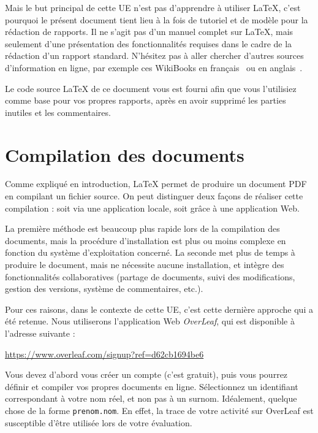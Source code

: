 \documentclass{ceri/sty/rapport}
\begin{document}
Mais le but principal de cette UE n'est pas d'apprendre à utiliser \LaTeX{}, c'est pourquoi le présent document tient lieu à la fois de tutoriel et de modèle pour la rédaction de rapports. Il ne s'agit pas d'un manuel complet sur \LaTeX{}, mais seulement d'une présentation des fonctionnalités requises dans le cadre de la rédaction d'un rapport standard. N'hésitez pas à aller chercher d'autres sources d'information en ligne, par exemple ces WikiBooks en français~\cite{Wikibooks2010} ou en anglais~\cite{Wikibooks2011}.
	
Le code source \LaTeX{} de ce document vous est fourni afin que vous l'utilisiez comme base pour vos propres rapports, après en avoir supprimé les parties inutiles et les commentaires.









\section{Compilation des documents}
\label{sec:Compilation}
Comme expliqué en introduction, \LaTeX{} permet de produire un document PDF en compilant un fichier source. On peut distinguer deux façons de réaliser cette compilation : soit via une application locale, soit grâce à une application Web. 

La première méthode est beaucoup plus rapide lors de la compilation des documents, mais la procédure d'installation est plus ou moins complexe en fonction du système d'exploitation concerné. La seconde met plus de temps à produire le document, mais ne nécessite aucune installation, et intègre des fonctionnalités collaboratives (partage de documents, suivi des modifications, gestion des versions, système de commentaires, etc.). 

Pour ces raisons, dans le contexte de cette UE, c'est cette dernière approche qui a été retenue. Nous utiliserons l'application Web \textit{OverLeaf}, qui est disponible à l'adresse suivante : 
\centerline{\url{https://www.overleaf.com/signup?ref=d62cb1694be6}}

Vous devez d'abord vous créer un compte (c'est gratuit), puis vous pourrez définir et compiler vos propres documents en ligne. Sélectionnez un identifiant correspondant à votre nom réel, et non pas à un surnom. Idéalement, quelque chose de la forme \texttt{prenom.nom}. En effet, la trace de votre activité sur OverLeaf est susceptible d'être utilisée lors de votre évaluation.
\end{document}
